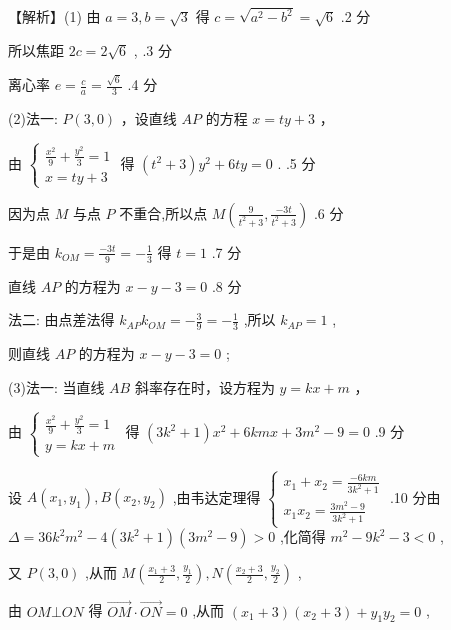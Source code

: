 \documentclass[10pt]{article}
\newcommand*\circled[1]{\tikz[baseline=(char.base)]{\node[shape=circle,draw,inner sep=1.5pt] (char) {\small #1};}}
\begin{document}
【解析】(1) 由 \(a = 3,b = \sqrt{3}\) 得 \(c = \sqrt{{a}^{2} - {b}^{2}} = \sqrt{6}\) .2 分

所以焦距 \({2c} = 2\sqrt{6}\) , .3 分

离心率 \(e = \frac{c}{a} = \frac{\sqrt{6}}{3}\) .4 分

(2)法一: \(P\left( {3,0}\right)\) ，设直线 \({AP}\) 的方程 \(x = {ty} + 3\) ，

由 \(\left\{  \begin{array}{l} \frac{{x}^{2}}{9} + \frac{{y}^{2}}{3} = 1 \\  x = {ty} + 3 \end{array}\right.\) 得 \(\left( {{t}^{2} + 3}\right) {y}^{2} + {6ty} = 0\) . .5 分

因为点 \(M\) 与点 \(P\) 不重合,所以点 \(M\left( {\frac{9}{{t}^{2} + 3},\frac{-{3t}}{{t}^{2} + 3}}\right)\) .6 分

于是由 \({k}_{OM} = \frac{-{3t}}{9} =  - \frac{1}{3}\) 得 \(t = 1\) .7 分

直线 \({AP}\) 的方程为 \(x - y - 3 = 0\) .8 分

法二: 由点差法得 \({k}_{AP}{k}_{OM} =  - \frac{3}{9} =  - \frac{1}{3}\) ,所以 \({k}_{AP} = 1\) ,

则直线 \({AP}\) 的方程为 \(x - y - 3 = 0\) ;

(3)法一: \circled{1} 当直线 \({AB}\) 斜率存在时，设方程为 \(y = {kx} + m\) ，

由 \(\left\{  \begin{array}{l} \frac{{x}^{2}}{9} + \frac{{y}^{2}}{3} = 1 \\  y = {kx} + m \end{array}\right.\) 得 \(\left( {3{k}^{2} + 1}\right) {x}^{2} + {6kmx} + 3{m}^{2} - 9 = 0\) .9 分

设 \(A\left( {{x}_{1},{y}_{1}}\right) ,B\left( {{x}_{2},{y}_{2}}\right)\) ,由韦达定理得 \(\left\{  \begin{array}{l} {x}_{1} + {x}_{2} = \frac{-{6km}}{3{k}^{2} + 1} \\  {x}_{1}{x}_{2} = \frac{3{m}^{2} - 9}{3{k}^{2} + 1} \end{array}\right.\) .10 分由 \(\Delta  = {36}{k}^{2}{m}^{2} - 4\left( {3{k}^{2} + 1}\right) \left( {3{m}^{2} - 9}\right)  > 0\) ,化简得 \({m}^{2} - 9{k}^{2} - 3 < 0\) ,

又 \(P\left( {3,0}\right)\) ,从而 \(M\left( {\frac{{x}_{1} + 3}{2},\frac{{y}_{1}}{2}}\right) ,N\left( {\frac{{x}_{2} + 3}{2},\frac{{y}_{2}}{2}}\right)\) ,

由 \({OM} \bot  {ON}\) 得 \(\overrightarrow{OM} \cdot  \overrightarrow{ON} = 0\) ,从而 \(\left( {{x}_{1} + 3}\right) \left( {{x}_{2} + 3}\right)  + {y}_{1}{y}_{2} = 0\) ,
\end{document}
